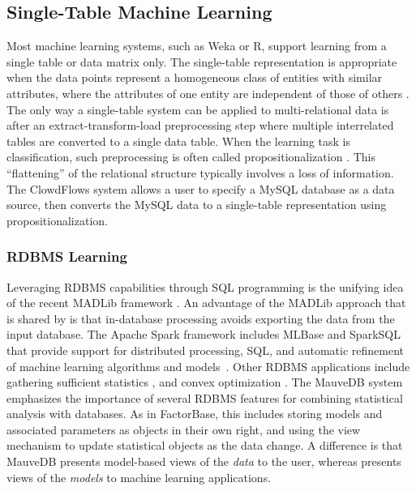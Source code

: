 \subsection{Single-Table Machine Learning} Most machine learning systems, such as Weka or R, support learning from a single table or data matrix only. The single-table representation is appropriate when the data points represent a homogeneous class of entities with similar attributes, where the attributes of one entity are independent of those of others \cite{Kimmig2015}. The only way a single-table system can be applied to multi-relational data is after an extract-transform-load preprocessing step where multiple interrelated tables are converted to a single data table. When the learning task is classification, such preprocessing is often called propositionalization  \cite{Kimmig2015}.  This ``flattening'' of the relational structure typically involves a loss of information.  The ClowdFlows system \cite{Lavravc2014} allows a user to specify a MySQL database as a data source, then converts the MySQL data to a single-table representation using propositionalization. 


\subsubsection{RDBMS Learning}
Leveraging RDBMS capabilities through SQL programming 
is the unifying idea of the recent MADLib framework \cite{MADlib_VLDB_2012}. An advantage of the MADLib approach that is shared by \FB  is that in-database processing avoids exporting the data from the input database. The Apache Spark \cite{Committers} framework includes MLBase and SparkSQL that provide support for distributed processing, SQL, and automatic refinement of machine learning algorithms and models~\cite{MLbase_ICDR_2013}.
Other RDBMS applications include gathering sufficient statistics \cite{Graefe1998}, and convex optimization \cite{Feng_SIGMOD_2012}. The MauveDB system \cite{Deshpande2006} emphasizes the importance of several RDBMS features for combining statistical analysis with databases.
As in {\sc FactorBase}, this includes 
storing models and associated parameters as objects in their own right, 
and using the view mechanism to update statistical objects as the data change.
A difference is that
MauveDB presents model-based views of the {\em data} to the user, whereas \FB  presents views of the {\em models} to machine learning applications. 


